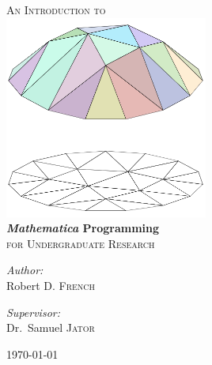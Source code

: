 \begin{titlepage}
\begin{center}
\textsc{\LARGE An Introduction to}\\[1.5cm]
\includegraphics[width=0.5\textwidth]{500px-Piecewise_linear_function2D.png}\\[1cm]    
{ \huge \bfseries \emph{Mathematica} Programming}\\[0.4cm]
\textsc{\Large for Undergraduate Research}\\[0.5cm]
\begin{minipage}{0.4\textwidth}
\begin{flushleft} \large
\emph{Author:}\\
Robert D. \textsc{French}
\end{flushleft}
\end{minipage}
\begin{minipage}{0.4\textwidth}
\begin{flushright} \large
\emph{Supervisor:} \\
Dr.~Samuel \textsc{Jator}
\end{flushright}
\end{minipage}
\vfill
{\large \today}
\end{center}
\end{titlepage}
